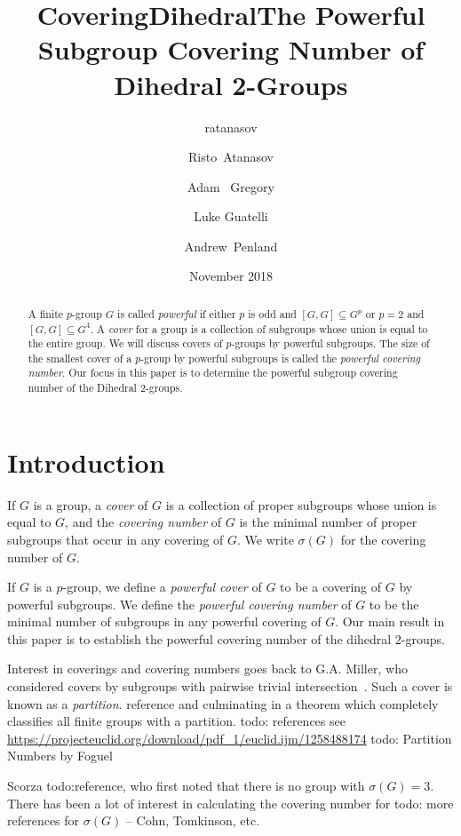 \documentclass{amsart}
\title{CoveringDihedral}
\author{ratanasov }
\date{November 2018}
\title[The Powerful Subgroup Covering Number of Dihedral 2-Groups]%
            {The Powerful Subgroup Covering Number of Dihedral 2-Groups}
\author[R.~Atanasov]{Risto~Atanasov}
\author[A.~Gregory]{Adam ~Gregory}
\author[L.~Guatelli]{Luke Guatelli}
\author[A.~Penland]{Andrew~Penland}
\numberwithin{equation} {section}
\theoremstyle{definition}
\begin{document}
\maketitle

\begin{abstract}
A finite $p$-group $G$ is called \textit{powerful} if either $p$ is odd and $[G,G]\subseteq G^p$ or $p=2$ and $[G,G]\subseteq G^4$. A {\em{cover}} for a group is a collection of subgroups whose union is equal to the entire group.   We will discuss covers of $p$-groups by powerful subgroups. The size of the smallest cover of a $p$-group by powerful subgroups is called the \textit{powerful covering number}. Our focus in this paper is to determine the powerful subgroup covering number of the Dihedral 2-groups.
\end{abstract}



\maketitle

\section{Introduction}

If $G$ is a group, a \textit{cover} of $G$ is a collection of proper subgroups whose union is equal to $G$, and the \textit{covering number} of $G$ is the minimal number of proper subgroups that occur in any covering of $G$. We write $\sigma(G)$ for the covering number of $G$. 

If $G$ is a $p$-group, we define a \textit{powerful cover} of $G$ to be a covering of $G$ by powerful subgroups. We define the \textit{powerful covering number} of $G$ to be the minimal number of subgroups in any powerful covering of $G$. Our main result in this paper is to establish the powerful covering number of the dihedral $2$-groups. 

Interest in coverings and covering numbers goes back to G.A. Miller, who considered covers by subgroups with pairwise trivial intersection~\cite{}. Such a cover is known as a \textit{partition}. reference and culminating in a theorem which completely classifies all finite groups with a partition. todo: references  see \url{https://projecteuclid.org/download/pdf_1/euclid.ijm/1258488174}  todo: Partition Numbers by Foguel

Scorza todo:reference, who first noted that there is no group with $\sigma(G) = 3.$ There has been a lot of interest in calculating the covering number for  todo: more references for $\sigma(G)$ -- Cohn, Tomkinson, etc. 
\end{document}
